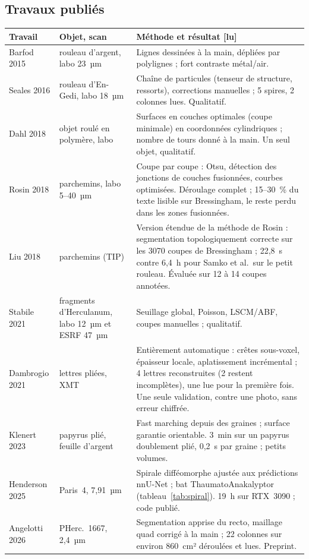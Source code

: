 \documentclass[11pt,a4paper]{article}
\newcommand{\lu}{\textsf{\small[lu]}}
\newcommand{\pherc}[1]{PHerc.~#1}
\begin{document}
\subsection{Travaux publiés}

\begin{longtable}{@{}p{3.3cm}p{3.4cm}p{8.1cm}@{}}
\toprule
Travail & Objet, scan & Méthode et résultat \lu \\
\midrule
\endhead
Barfod 2015 \cite{barfod2015} & rouleau d'argent, labo 23~µm & Lignes dessinées à la main, dépliées par polylignes ; fort contraste métal/air. \\
Seales 2016 \cite{seales2016} & rouleau d'En-Gedi, labo 18~µm & Chaîne de particules (tenseur de structure, ressorts), corrections manuelles ; 5 spires, 2 colonnes lues. Qualitatif. \\
Dahl 2018 \cite{dahl2018} & objet roulé en polymère, labo & Surfaces en couches optimales (coupe minimale) en coordonnées cylindriques ; nombre de tours donné à la main. Un seul objet, qualitatif. \\
Rosin 2018 \cite{rosin2018} & parchemins, labo 5–40~µm & Coupe par coupe : Otsu, détection des jonctions de couches fusionnées, courbes optimisées. Déroulage complet ; 15–30~\% du texte lisible sur Bressingham, le reste perdu dans les zones fusionnées. \\
Liu 2018 \cite{liu2018} & parchemins (TIP) & Version étendue de la méthode de Rosin : segmentation topologiquement correcte sur les 3070 coupes de Bressingham ; 22,8~s contre 6,4~h pour Samko et al.\ sur le petit rouleau. Évaluée sur 12 à 14 coupes annotées. \\
Stabile 2021 \cite{stabile2021} & fragments d'Herculanum, labo 12~µm et ESRF 47~µm & Seuillage global, Poisson, LSCM/ABF, coupes manuelles ; qualitatif. \\
Dambrogio 2021 \cite{dambrogio2021} & lettres pliées, XMT & Entièrement automatique : crêtes sous-voxel, épaisseur locale, aplatissement incrémental ; 4 lettres reconstruites (2 restent incomplètes), une lue pour la première fois. Une seule validation, contre une photo, sans erreur chiffrée. \\
Klenert 2023 \cite{klenert2023} & papyrus plié, feuille d'argent & Fast marching depuis des graines ; surface garantie orientable. 3~min sur un papyrus doublement plié, 0,2~s par graine ; petits volumes. \\
Henderson 2025 \cite{henderson2025} & Paris~4, 7,91~µm & Spirale difféomorphe ajustée aux prédictions nnU-Net ; bat ThaumatoAnakalyptor (tableau~\ref{tab:spiral}). 19~h sur RTX~3090 ; code publié. \\
Angelotti 2026 \cite{angelotti2026complete} & \pherc{1667}, 2,4~µm & Segmentation apprise du recto, maillage quad corrigé à la main ; 22 colonnes sur environ 860~cm² déroulées et lues. Preprint. \\
\bottomrule
\end{longtable}
\end{document}
